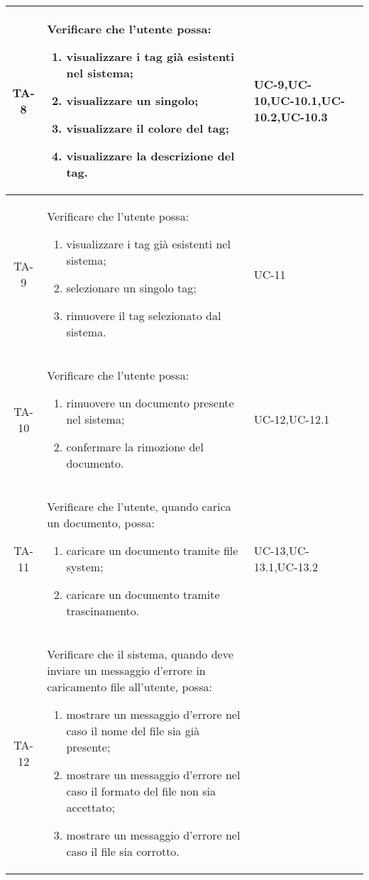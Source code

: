 \begin{xltabular}{\textwidth}{| c | X | X | c |}
    \hline
    TA-8 & Verificare che l’utente possa:
    \begin{enumerate}
        \item visualizzare i tag già esistenti nel sistema;
        \item visualizzare un singolo;
        \item visualizzare il colore del tag;
        \item visualizzare la descrizione del tag.
    \end{enumerate}& UC-9,\newline UC-10,\newline UC-10.1,\newline UC-10.2,\newline UC-10.3 & \textcolor{xmarkcolor}{} \\
    \hline
     TA-9 & Verificare che l’utente possa:
    \begin{enumerate}
        \item visualizzare i tag già esistenti nel sistema;
        \item selezionare un singolo tag;
        \item rimuovere il tag selezionato dal sistema.
        
    \end{enumerate}& UC-11 & \textcolor{xmarkcolor}{} \\
    \hline
     TA-10 & Verificare che l’utente possa:
    \begin{enumerate}
        \item rimuovere un documento presente nel sistema;
        \item confermare la rimozione del documento.
        
    \end{enumerate}& UC-12,\newline UC-12.1 & \textcolor{xmarkcolor}{} \\
    \hline
    TA-11 & Verificare che l’utente, quando carica un documento, possa:
    \begin{enumerate}
        \item caricare un documento tramite file system;
        \item caricare un documento tramite trascinamento.
        
    \end{enumerate}& UC-13,\newline UC-13.1,\newline UC-13.2 & \textcolor{xmarkcolor}{} \\
    \hline
    TA-12 & Verificare che il sistema, quando deve inviare un messaggio d'errore in caricamento file all'utente, possa:
    \begin{enumerate}
        \item mostrare un messaggio d'errore nel caso il nome del file sia già presente;
        \item mostrare un messaggio d'errore nel caso il formato del file non sia accettato;
        \item mostrare un messaggio d'errore nel caso il file sia corrotto.
        

\end{enumerate}
\end{xltabular}
